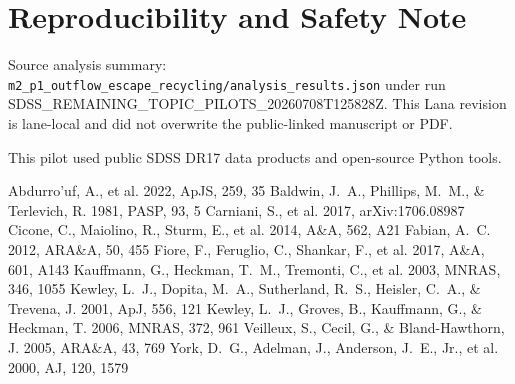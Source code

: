 \documentclass[twocolumn]{aastex631}
\begin{document}
\section*{Reproducibility and Safety Note}
Source analysis summary: \texttt{m2\_p1\_outflow\_escape\_recycling/analysis\_results.json} under run SDSS\_REMAINING\_TOPIC\_PILOTS\_20260708T125828Z.  This Lana revision is lane-local and did not overwrite the public-linked manuscript or PDF.

\acknowledgments
This pilot used public SDSS DR17 data products and open-source Python tools.

\begin{thebibliography}{}
 Abdurro'uf, A., et al. 2022, ApJS, 259, 35
 Baldwin, J.~A., Phillips, M.~M., \& Terlevich, R. 1981, PASP, 93, 5
 Carniani, S., et al. 2017, arXiv:1706.08987
 Cicone, C., Maiolino, R., Sturm, E., et al. 2014, A\&A, 562, A21
 Fabian, A.~C. 2012, ARA\&A, 50, 455
 Fiore, F., Feruglio, C., Shankar, F., et al. 2017, A\&A, 601, A143
 Kauffmann, G., Heckman, T.~M., Tremonti, C., et al. 2003, MNRAS, 346, 1055
 Kewley, L.~J., Dopita, M.~A., Sutherland, R.~S., Heisler, C.~A., \& Trevena, J. 2001, ApJ, 556, 121
 Kewley, L.~J., Groves, B., Kauffmann, G., \& Heckman, T. 2006, MNRAS, 372, 961
 Veilleux, S., Cecil, G., \& Bland-Hawthorn, J. 2005, ARA\&A, 43, 769
 York, D.~G., Adelman, J., Anderson, J.~E., Jr., et al. 2000, AJ, 120, 1579
\end{thebibliography}
\end{document}

